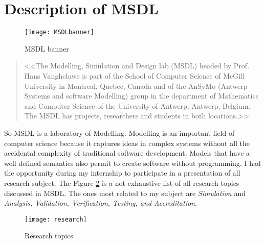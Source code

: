 \section{Description of MSDL}


\begin{figure}[!h]
  \centering
  \texttt{[image: MSDLbanner]}
  \caption{MSDL banner}
  \label{fig:msdl}
\end{figure}


\begin{quotation}
<<The Modelling, Simulation and Design lab (MSDL) headed by Prof. Hans Vangheluwe is part of the School of Computer Science of McGill University in Montreal, Quebec, Canada and of the AnSyMo (Antwerp Systems and software Modelling) group in the department of Mathematics and Computer Science of the University of Antwerp, Antwerp, Belgium. The MSDL has projects, researchers and students in both locations.>>\cite{msdl}
\end{quotation}


So MSDL is a laboratory of Modelling. Modelling is an important field of computer science because it captures ideas in complex systems without all the accidental complexity of traditional software development. Models that have a well defined semantics also permit to create software without programming. I had the opportunity during my internship to participate in a presentation of all research subject. The Figure \ref{fig:subject} is a not exhaustive list of all research topics discussed in MSDL. The ones most related to my subject are \textit{Simulation} and \textit{Analysis, Validation, Verification, Testing, and Accreditation}.


\begin{figure}[h]
  \centering
  \texttt{[image: research]}
  \caption{Research topics}
  \label{fig:subject}
\end{figure}



